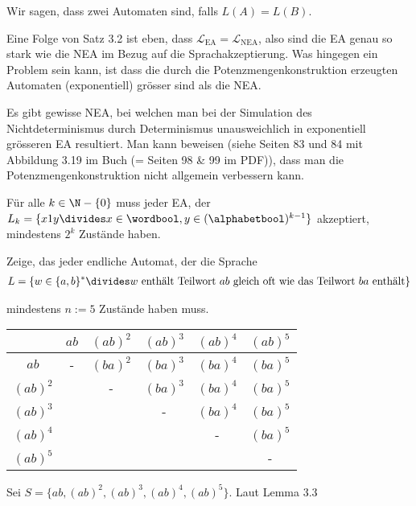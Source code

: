 Wir sagen, dass zwei Automaten  sind, falls $L(A) = L(B)$.

Eine Folge von Satz 3.2 ist eben, dass $\mathcal{L}_{\text{EA}} = \mathcal{L}_{\text{NEA}}$, also sind die EA genau so stark wie die NEA im Bezug auf die Sprachakzeptierung.
Was hingegen ein Problem sein kann, ist dass die durch die Potenzmengenkonstruktion erzeugten Automaten (exponentiell) grösser sind als die NEA.

Es gibt gewisse NEA, bei welchen man bei der Simulation des Nichtdeterminismus durch Determinismus unausweichlich in exponentiell grösseren EA resultiert.
Man kann beweisen (siehe Seiten 83 und 84 mit Abbildung 3.19 im Buch (= Seiten 98 \& 99 im PDF)), dass man die Potenzmengenkonstruktion nicht allgemein verbessern kann.

\inlinelemma Für alle $k \in \N - \{ 0 \}$ muss jeder EA, der $L_k = \{ x1y \divides x \in \wordbool, y \in (\alphabetbool)^{k - 1} \}$ akzeptiert, mindestens $2^k$ Zustände haben.

 Zeige, das jeder endliche Automat, der die Sprache
\rmvspace
\begin{align*}
    L = \{ w \in \{ a , b \}^* \divides w \text{ enthält Teilwort $ab$ gleich oft wie das Teilwort $ba$ enthält} \}
\end{align*}

\drmvspace
mindestens $n := 5$ Zustände haben muss.

\begin{table}[h!]
    \begin{center}
        \begin{tabular}[c]{c|ccccc}
                     & $ab$ & $(ab)^2$ & $(ab)^3$ & $(ab)^4$ & $(ab)^5$ \\
            \hline
            $ab$     & -    & $(ba)^2$ & $(ba)^3$ & $(ba)^4$ & $(ba)^5$ \\
            $(ab)^2$ &      & -        & $(ba)^3$ & $(ba)^4$ & $(ba)^5$ \\
            $(ab)^3$ &      &          & -        & $(ba)^4$ & $(ba)^5$ \\
            $(ab)^4$ &      &          &          & -        & $(ba)^5$ \\
            $(ab)^5$ &      &          &          &          & -        \\
        \end{tabular}
    \end{center}
\end{table}
Sei $S = \{ ab, (ab)^2, (ab)^3, (ab)^4, (ab)^5 \}$.
Laut Lemma 3.3
